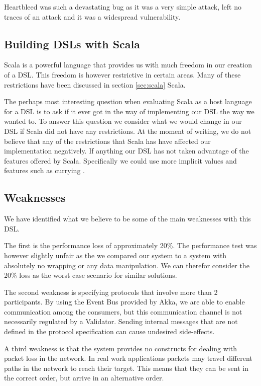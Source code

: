 Heartbleed was such a devastating bug as it was a very simple attack, left no traces of an attack and it was a widespread vulnerability. 



\subsection{Building DSLs with Scala}
Scala is a powerful language that provides us with much freedom in our creation of a DSL. This freedom is however restrictive in certain areas. Many of these restrictions have been discussed in section \ref{sec:scala} Scala.
 
The perhaps most interesting question when evaluating Scala as a host language for a DSL is to ask if it ever got in the way of implementing our DSL the way we wanted to. To answer this question we consider what we would change in our DSL if Scala did not have any restrictions. At the moment of writing, we do not believe that any of the restrictions that Scala has have affected our implementation negatively. If anything our DSL has not taken advantage of the features offered by Scala. Specifically we could use more implicit values and features such as currying \cite{odersky2008programming}. 


\subsection{Weaknesses}
We have identified what we believe to be some of the main weaknesses with this DSL.

The first is the performance loss of approximately 20\%. The performance test was however slightly unfair as the we compared our system to a system with absolutely no wrapping or any data manipulation. We can therefor consider the 20\% loss as the worst case scenario for similar solutions.

The second weakness is specifying protocols that involve more than 2 participants. By using the Event Bus provided by Akka, we are able to enable communication among the consumers, but this communication channel is not necessarily regulated by a Validator. Sending internal messages that are not defined in the protocol specification can cause undesired side-effects. 

A third weakness is that the system provides no constructs for dealing with packet loss in the network. In real work applications packets may travel different paths in the network to reach their target. This means that they can be sent in the correct order, but arrive in an alternative order.

